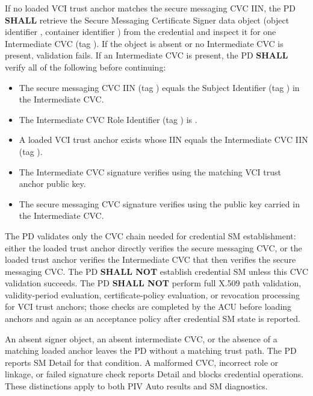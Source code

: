 If no loaded VCI trust anchor matches the secure messaging CVC IIN, the PD \textbf{SHALL} retrieve the Secure Messaging Certificate Signer data object (object identifier , container identifier ) from the credential and inspect it for one Intermediate CVC (tag ). If the object is absent or no Intermediate CVC is present, validation fails. If an Intermediate CVC is present, the PD \textbf{SHALL} verify all of the following before continuing:
\begin{itemize}
  \item The secure messaging CVC IIN (tag ) equals the Subject Identifier (tag ) in the Intermediate CVC.
  \item The Intermediate CVC Role Identifier (tag ) is .
  \item A loaded VCI trust anchor exists whose IIN equals the Intermediate CVC IIN (tag ).
  \item The Intermediate CVC signature verifies using the matching VCI trust anchor public key.
  \item The secure messaging CVC signature verifies using the public key carried in the Intermediate CVC.
\end{itemize}

The PD validates only the CVC chain needed for credential SM establishment: either the loaded trust anchor directly verifies the secure messaging CVC, or the loaded trust anchor verifies the Intermediate CVC that then verifies the secure messaging CVC. The PD \textbf{SHALL NOT} establish credential SM unless this CVC validation succeeds. The PD \textbf{SHALL NOT} perform full X.509 path validation, validity-period evaluation, certificate-policy evaluation, or revocation processing for VCI trust anchors; those checks are completed by the ACU before loading anchors and again as an acceptance policy after credential SM state is reported.

An absent signer object, an absent intermediate CVC, or the absence of a
matching loaded anchor leaves the PD without a matching trust path. The PD
reports SM Detail  for that condition. A malformed CVC, incorrect
role or linkage, or failed signature check reports Detail  and
blocks credential operations. These distinctions apply to both PIV Auto
results and SM diagnostics.

